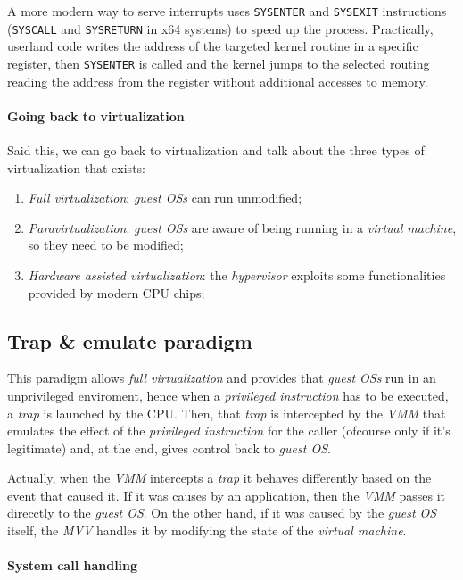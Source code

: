 A more modern way to serve interrupts uses \texttt{SYSENTER} and
\texttt{SYSEXIT} instructions (\texttt{SYSCALL} and \texttt{SYSRETURN} in
x64 systems) to speed up the process. Practically, userland code writes the
address of the targeted kernel routine in a specific register, then
\texttt{SYSENTER} is called and the kernel jumps to the selected routing
reading the address from the register without additional accesses to memory.

\paragraph{Going back to virtualization}
Said this, we can go back to virtualization and talk about the three types
of virtualization that exists:
\begin{enumerate}
    \item\emph{Full virtualization}: \emph{guest OSs} can run unmodified;
    \item\emph{Paravirtualization}: \emph{guest OSs} are aware of being running
    in a \emph{virtual machine}, so they need to be modified;
    \item\emph{Hardware assisted virtualization}: the \emph{hypervisor} exploits
    some functionalities provided by modern CPU chips;
\end{enumerate}

\subsection{Trap \& emulate paradigm}
This paradigm allows \emph{full virtualization} and provides that \emph{guest
OSs} run in an unprivileged enviroment, hence when a \emph{privileged
instruction} has to be executed, a \emph{trap} is launched by the CPU. Then,
that \emph{trap} is intercepted by the \emph{VMM} that emulates the effect of
the \emph{privileged instruction} for the caller (ofcourse only if it's
legitimate) and, at the end, gives control back to \emph{guest OS}.

Actually, when the \emph{VMM} intercepts a \emph{trap} it behaves differently
based on the event that caused it. If it was causes by an application, then the
\emph{VMM} passes it direcctly to the \emph{guest OS}. On the other hand, if it
was caused by the \emph{guest OS} itself, the \emph{MVV} handles it by
modifying the state of the \emph{virtual machine}.

\paragraph{System call handling}
\mbox{}


